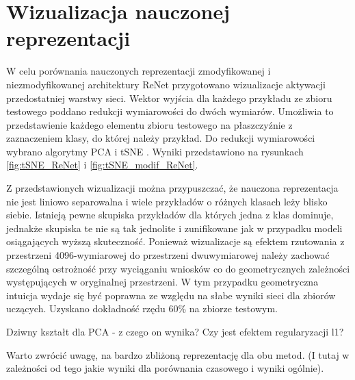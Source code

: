 \documentclass[oneside, mag]{mgr}
\begin{document}
\section{Wizualizacja nauczonej reprezentacji}

W celu porównania nauczonych reprezentacji zmodyfikowanej i niezmodyfikowanej architektury ReNet przygotowano wizualizacje aktywacji przedostatniej warstwy sieci. Wektor wyjścia dla każdego przykładu ze zbioru testowego poddano redukcji wymiarowości do dwóch wymiarów. Umożliwia to przedstawienie każdego elementu zbioru testowego na płaszczyźnie z zaznaczeniem klasy, do której należy przykład. Do redukcji wymiarowości wybrano algorytmy PCA i tSNE \cite{tSNE}. Wyniki przedstawiono na rysunkach \ref{fig:tSNE_ReNet} i \ref{fig:tSNE_modif_ReNet}.

Z przedstawionych wizualizacji można przypuszczać, że nauczona reprezentacja nie jest liniowo separowalna i wiele przykładów o różnych klasach leży blisko siebie. Istnieją pewne skupiska przykładów dla których jedna z klas dominuje, jednakże skupiska te nie są tak jednolite i zunifikowane jak w przypadku modeli osiągających wyższą skuteczność.
Ponieważ wizualizacje są efektem rzutowania z przestrzeni 4096-wymiarowej do przestrzeni dwuwymiarowej należy zachować szczególną ostrożność przy wyciąganiu wniosków co do geometrycznych zależności występujących w oryginalnej przestrzeni. W tym przypadku geometryczna intuicja wydaje się być poprawna ze względu na słabe wyniki sieci dla zbiorów uczących. Uzyskano dokładność rzędu 60\% na zbiorze testowym.

Dziwny kształt dla PCA - z czego on wynika? Czy jest efektem regularyzacji l1?

Warto zwrócić uwagę, na bardzo zbliżoną reprezentację dla obu metod. (I tutaj w zależności od tego jakie wyniki dla porównania czasowego i wyniki ogólnie).
\end{document}
